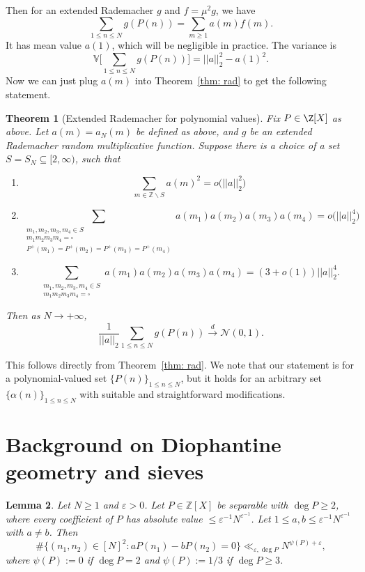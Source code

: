 \documentclass[reqno, 12pt]{amsart}
\theoremstyle{plain}
\newtheorem{theorem}{Theorem}[section]
\newtheorem{lemma}[theorem]{Lemma}
\theoremstyle{definition}
\theoremstyle{remark}
\renewcommand{\le}{\leqslant}
\renewcommand{\ge}{\geqslant}
\begin{document}
Then for an extended Rademacher $g$ and $f= \mu^2g$, we have 
\[\sum_{1\le n \le N} g(P(n)) = \sum_{m\ge 1} a(m) f(m). \]
It has mean value $a(1)$, which will be negligible in practice.
The variance is 
\[\mathbb{V}\Big[\sum_{1\le n \le N} g(P(n))\Big] =  || a ||_2^2 - a(1)^2.\]
Now we can just plug $a(m)$ into Theorem~\ref{thm: rad} to get the following statement. 


\begin{theorem}[Extended Rademacher for polynomial values]\label{theorem Extended Rademacher}
Fix $P\in \Z[X]$ as above.
    Let $a(m) = a_N(m)$ be defined as above, and $g$ be an extended Rademacher random multiplicative function. Suppose there is a choice of a set $S=S_N \subseteq [2,\infty)$, such that
    \begin{enumerate}
        \item 
        \[\sum_{m\in \mathbb{Z} \smallsetminus S} a(m)^{2} = o\big( || a ||_2^2\big) \]
        \item \[\sum_{\substack{m_1, m_2, m_3, m_4 \in S \\ m_1m_2m_3m_4 =\square\\ P^{+}(m_1)=P^{+}(m_2) = P^{+}(m_3)=P^{+}(m_4)}}  a(m_1)a(m_2)a(m_3)a(m_4)  =  o \big(  || a ||_2^4 \big) \]
        \item \[\sum_{\substack{m_1, m_2, m_3, m_4 \in S \\ m_1m_2m_3m_4 =\square}}  a(m_1)a(m_2)a(m_3)a(m_4)  =  (3+o(1))|| a ||_2^4. \]
    \end{enumerate}
        Then as $N\to +\infty$, 
    \[\frac{1}{ || a ||_2} \sum_{1\le n \le N} g(P(n)) \xrightarrow[]{d} \mathcal{N}(0,1). \]
\end{theorem}


This follows directly from Theorem~\ref{thm: rad}. 
    We note that our statement is for a polynomial-valued set $\{P(n)\}_{1\le n \le N}$, but it holds for an arbitrary set $\{\alpha(n)\}_{1\le n \le N}$ with suitable and straightforward modifications.  





\section{Background on Diophantine geometry and sieves}

\begin{lemma}
\label{CS2.5}
Let $N\ge 1$ and $\varepsilon > 0$.
Let $P\in \mathbb{Z}[X]$ be separable with $\deg{P} \ge 2$,
where every coefficient of $P$ has absolute value
$\le \varepsilon^{-1} N^{\varepsilon^{-1}}$.
Let $1\le a,b \le \varepsilon^{-1} N^{\varepsilon^{-1}}$ with $a\ne b$.
Then
\[
\#\{(n_1,n_2)\in [N]^2: aP(n_1) - bP(n_2) = 0\}
  \ll_{\varepsilon,\deg{P}} N^{\psi(P)+\varepsilon},
\]
where $\psi(P) := 0$ if $\deg{P}=2$ and $\psi(P) := 1/3$ if $\deg{P}\ge 3$.
\end{lemma}
\end{document}
